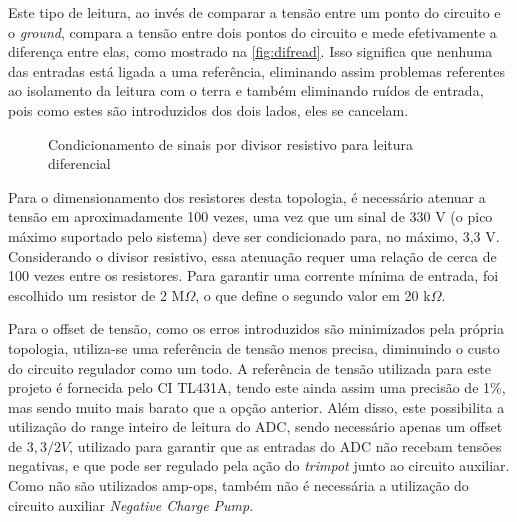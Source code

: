 Este tipo de leitura, ao invés de comparar a tensão entre um ponto do circuito e o \textit{ground}, compara a tensão entre dois pontos do circuito e mede efetivamente a diferença entre elas, como mostrado na \autoref{fig:difread}. Isso significa que nenhuma das entradas está ligada a uma referência, eliminando assim problemas referentes ao isolamento da leitura com o terra e também eliminando ruídos de entrada, pois como estes são introduzidos dos dois lados, eles se cancelam.

\begin{figure}[htb!]
    \caption{Condicionamento de sinais por divisor resistivo para leitura diferencial}
    \label{fig:difread}
    \fonte{}
\end{figure}

Para o dimensionamento dos resistores desta topologia, é necessário atenuar a tensão em aproximadamente 100 vezes, uma vez que um sinal de 330 V (o pico máximo suportado pelo sistema) deve ser condicionado para, no máximo, 3,3 V. Considerando o divisor resistivo, essa atenuação requer uma relação de cerca de 100 vezes entre os resistores. Para garantir uma corrente mínima de entrada, foi escolhido um resistor de 2 M$\Omega$, o que define o segundo valor em 20 k$\Omega$.

Para o offset de tensão, como os erros introduzidos são minimizados pela própria topologia, utiliza-se uma referência de tensão menos precisa, diminuindo o custo do circuito regulador como um todo. A referência de tensão utilizada para este projeto é fornecida pelo \gls{CI} TL431A, tendo este ainda assim uma precisão de 1\%, mas sendo muito mais barato que a opção anterior. Além disso, este possibilita a utilização do range inteiro de leitura do \gls{ADC}, sendo necessário apenas um offset de $3,3/2 V$, utilizado para garantir que as entradas do ADC não recebam tensões negativas, e que pode ser regulado pela ação do \textit{trimpot} junto ao circuito auxiliar. Como não são utilizados \gls{amp-op}s, também não é necessária a utilização do circuito auxiliar \textit{Negative Charge Pump}.

